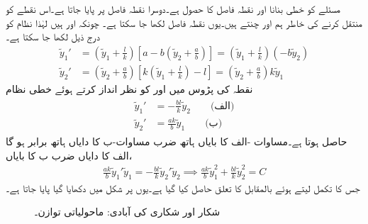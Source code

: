  مسئلے کو خطی بنانا اور نقطہ فاصل  کا حصول  ہے۔دوسرا نقطہ فاصل  پر پایا جاتا ہے۔اس نقطے  کو  منتقل کرنے کی خاطر ہم  اور  چنتے ہیں۔یوں نقطہ فاصل  لکھا جا سکتا ہے۔ چونکہ  اور  ہیں لہٰذا نظام  کو درج ذیل لکھا جا سکتا ہے۔
\begin{align*}
\tilde{y}_1'&=\left(\tilde{y}_1+\frac{l}{k}\right)\left[a-b\left(\tilde{y}_2+\frac{a}{b}\right)\right]=\left(\tilde{y}_1+\frac{l}{k}\right)(-b\tilde{y}_2)\\
\tilde{y}_2'&=\left(\tilde{y}_2+\frac{a}{b}\right)\left[k\left(\tilde{y}_1+\frac{l}{k}\right)-l\right]=\left(\tilde{y}_2+\frac{a}{b}\right)k\tilde{y}_1
\end{align*}
نقطہ  کی پڑوس میں  اور  کو نظر انداز کرتے ہوئے خطی نظام
\begin{gather}\label{مثال_نظام_شکار_شکاری_ب}
\begin{aligned}
\tilde{y}_1'&=-\frac{bl}{k}\tilde{y}_2\quad \quad \text{(الف)}\\
\tilde{y}_2'&=\frac{ak}{b}\tilde{y}_1\quad \quad \text{(ب)}
\end{aligned}
\end{gather}
حاصل ہوتا ہے۔مساوات -الف کا بایاں ہاتھ ضرب مساوات-ب کا دایاں ہاتھ برابر ہو گا الف کا دایاں ضرب ب کا بایاں،
\begin{align*}
\frac{ak}{b}\tilde{y}_1'\tilde{y}_1=-\frac{bl}{k}\tilde{y}_2'\tilde{y}_2 \implies \frac{ak}{b}\tilde{y}_1^2+\frac{bl}{k}\tilde{y}_2^2=C
\end{align*}
جس کا تکمل لیتے ہوئے  بالمقابل  کا  تعلق حاصل کیا گیا ہے۔یوں  پر شکل  میں دکھایا گیا  پایا جاتا ہے۔
\begin{figure}
\centering
{}
\caption{شکار اور شکاری کی آبادی: ماحولیاتی توازن۔}
\label{شکل_مثال_نظام_شکار_شکاری}
\end{figure}

